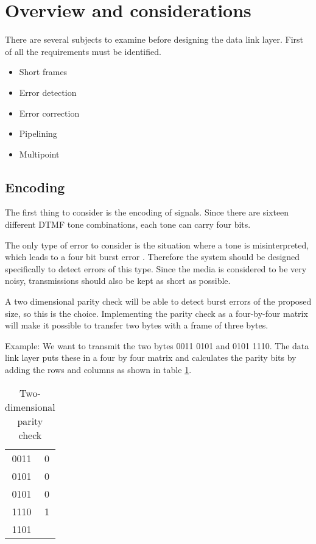 \section{Overview and considerations}\label{sec:dll_theory}

There are several subjects to examine before designing the data link layer.
First of all the requirements must be identified. 
\begin{itemize}
	\item Short frames
	\item Error detection
	\item Error correction
	\item Pipelining
	\item Multipoint
\end{itemize}

\subsection{Encoding}
The first thing to consider is the encoding of signals. Since there are sixteen
different DTMF tone combinations, each tone can carry four bits.

The only type of error to consider is the situation where a tone is
misinterpreted, which leads to a four bit burst error \cite[p. 267]{KOM}.
Therefore the system should be designed specifically to detect errors of this type. Since the media
is considered to be very noisy, transmissions should also be kept as short as
possible.

A two dimensional parity check will be able to detect burst errors of the
proposed size, so this is the choice. Implementing the parity check as a
four-by-four matrix will make it possible to transfer two bytes with a frame of
three bytes.

Example: We want to transmit the two bytes 0011 0101 and 0101 1110. The data
link layer puts these in a four by four matrix and calculates the parity bits by
adding the rows and columns as shown in table \ref{tab:two_dimensional_parity_check}.

\begin{table}[htb]
	\centering
	\begin{tabular}{c|c}
	0011 & 0 \\
	0101 & 0 \\
	0101 & 0 \\
	1110 & 1 \\
	\hline
	1101 & \\
	\end{tabular}
	\caption{Two-dimensional parity check}
	\label{tab:two_dimensional_parity_check}
\end{table}

